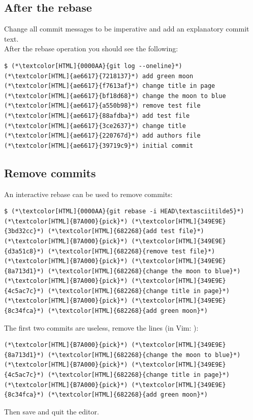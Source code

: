 \subsection{After the rebase}
\begin{frame}[fragile]
  \subslidetitle
  Change all commit messages to be imperative and add an explanatory commit text.
  \\
  \vspace{1em}
  After the rebase operation you should see the following:
  \begin{lstlisting}
$ (*\textcolor[HTML]{0000AA}{git log --oneline}*)
(*\textcolor[HTML]{ae6617}{7218137}*) add green moon
(*\textcolor[HTML]{ae6617}{f7613af}*) change title in page
(*\textcolor[HTML]{ae6617}{bf18d68}*) change the moon to blue
(*\textcolor[HTML]{ae6617}{a550b98}*) remove test file
(*\textcolor[HTML]{ae6617}{88afdba}*) add test file
(*\textcolor[HTML]{ae6617}{3ce2637}*) change title
(*\textcolor[HTML]{ae6617}{220767d}*) add authors file
(*\textcolor[HTML]{ae6617}{39719c9}*) initial commit
\end{lstlisting}
\end{frame}

\subsection{Remove commits}
\begin{frame}[fragile]
  \subslidetitle
  An interactive rebase can be used to remove commits:
  \begin{lstlisting}
$ (*\textcolor[HTML]{0000AA}{git rebase -i HEAD\textasciitilde5}*)
(*\textcolor[HTML]{B7A000}{pick}*) (*\textcolor[HTML]{349E9E}{3bd32cc}*) (*\textcolor[HTML]{682268}{add test file}*)
(*\textcolor[HTML]{B7A000}{pick}*) (*\textcolor[HTML]{349E9E}{d3a51c8}*) (*\textcolor[HTML]{682268}{remove test file}*)
(*\textcolor[HTML]{B7A000}{pick}*) (*\textcolor[HTML]{349E9E}{8a713d1}*) (*\textcolor[HTML]{682268}{change the moon to blue}*)
(*\textcolor[HTML]{B7A000}{pick}*) (*\textcolor[HTML]{349E9E}{4c5ac7c}*) (*\textcolor[HTML]{682268}{change title in page}*)
(*\textcolor[HTML]{B7A000}{pick}*) (*\textcolor[HTML]{349E9E}{8c34fca}*) (*\textcolor[HTML]{682268}{add green moon}*)
\end{lstlisting}
  The first two commits are useless, remove the lines (in Vim: ):
  \begin{lstlisting}
(*\textcolor[HTML]{B7A000}{pick}*) (*\textcolor[HTML]{349E9E}{8a713d1}*) (*\textcolor[HTML]{682268}{change the moon to blue}*)
(*\textcolor[HTML]{B7A000}{pick}*) (*\textcolor[HTML]{349E9E}{4c5ac7c}*) (*\textcolor[HTML]{682268}{change title in page}*)
(*\textcolor[HTML]{B7A000}{pick}*) (*\textcolor[HTML]{349E9E}{8c34fca}*) (*\textcolor[HTML]{682268}{add green moon}*)
\end{lstlisting}


  Then save and quit the editor.

\end{frame}

